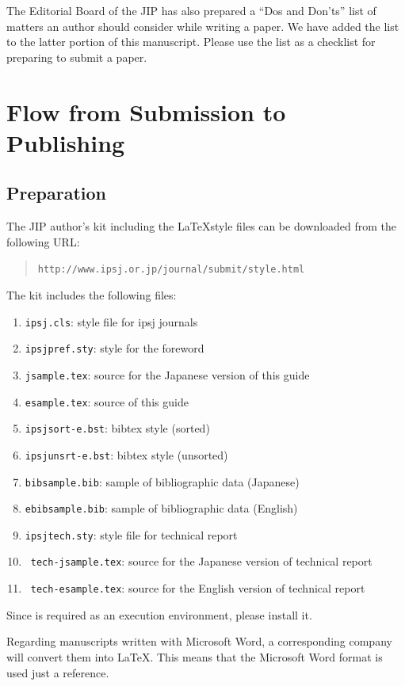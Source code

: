 \documentclass[english,preprint,JIP]{ipsj-lualatex}
\def\|{\verb|}
\begin{document}
The Editorial Board of the JIP has also prepared a ``Dos and Don'ts''
list of matters an author should consider while writing a paper.  We
have added the list to the latter portion of this manuscript.  Please
use the list as a checklist for preparing to submit a paper.

%2
\section{Flow from Submission to Publishing}
%2.1
\subsection{Preparation}

The JIP author's kit including the \LaTeX style files can be downloaded
from the following URL:
\begin{quote}
 \small
 \|http://www.ipsj.or.jp/journal/submit/style.html|
\end{quote}
The kit includes the following files:
\begin{enumerate}
\item \|ipsj.cls|: style file for ipsj journals
\item \|ipsjpref.sty|: style for the foreword
\item \|jsample.tex|: source for the Japanese version of this guide
\item \|esample.tex|: source of this guide
\item \|ipsjsort-e.bst|: bibtex style (sorted)
\item \|ipsjunsrt-e.bst|: bibtex style (unsorted)
\item \|bibsample.bib|: sample of bibliographic data (Japanese)
\item \|ebibsample.bib|: sample of bibliographic data (English)

\item \|ipsjtech.sty|: style file for technical report
\item \ \|tech-jsample.tex|: source for the Japanese version of technical report
\item \ \|tech-esample.tex|: source for the English version of technical report
\end{enumerate}



Since {\LaTeXe} is required as an execution environment, please install
it.

Regarding manuscripts written with Microsoft Word, a corresponding
company will convert them into \LaTeX\@.  This means that the Microsoft
Word format is used just a reference.
\end{document}

